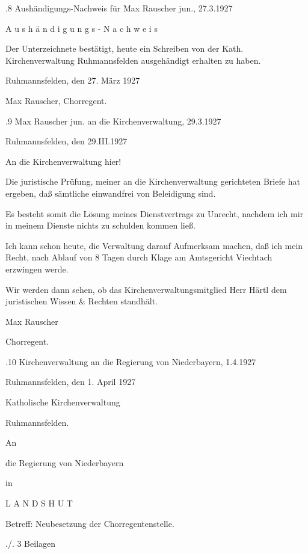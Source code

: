\documentclass[12pt,a4pager]{book}
\begin{document}
.8 Aushändigungs-Nachweis für Max Rauscher jun., 27.3.1927

A u s h ä n d i g u n g s - N a c h w e i s



Der Unterzeichnete bestätigt, heute ein Schreiben von der Kath.
Kirchenverwaltung Ruhmannsfelden ausgehändigt erhalten zu haben.



Ruhmannsfelden, den 27. März 1927



Max Rauscher, Chorregent.

.9 Max Rauscher jun. an die Kirchenverwaltung, 29.3.1927

Ruhmannsfelden, den 29.III.1927



An die Kirchenverwaltung hier!



Die juristische Prüfung, meiner an die Kirchenverwaltung gerichteten Briefe hat
ergeben, daß sämtliche einwandfrei von Beleidigung sind.

Es besteht somit die Lösung meines Dienstvertrags zu Unrecht, nachdem ich mir in
meinem Dienste nichts zu schulden kommen ließ.

Ich kann schon heute, die Verwaltung darauf Aufmerksam machen, daß ich mein
Recht, nach Ablauf von 8 Tagen durch Klage am Amtsgericht Viechtach erzwingen
werde.

Wir werden dann sehen, ob das Kirchenverwaltungsmitglied Herr Härtl dem
juristischen Wissen & Rechten standhält.



Max Rauscher

Chorregent.

.10 Kirchenverwaltung an die Regierung von Niederbayern, 1.4.1927

Ruhmannsfelden, den 1. April 1927

Katholische Kirchenverwaltung

Ruhmannsfelden.



An

die Regierung von Niederbayern

in

    L A N D S H U T



    Betreff: Neubesetzung der Chorregentenstelle.



./. 3 Beilagen
\end{document}
